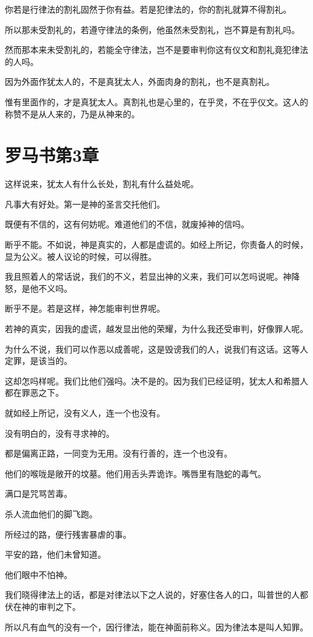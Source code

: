 \documentclass[12pt,oneside]{book}
\begin{document}
你若是行律法的割礼固然于你有益。若是犯律法的，你的割礼就算不得割礼。

所以那未受割礼的，若遵守律法的条例，他虽然未受割礼，岂不算是有割礼吗。

然而那本来未受割礼的，若能全守律法，岂不是要审判你这有仪文和割礼竟犯律法的人吗。

因为外面作犹太人的，不是真犹太人，外面肉身的割礼，也不是真割礼。

惟有里面作的，才是真犹太人。真割礼也是心里的，在乎灵，不在乎仪文。这人的称赞不是从人来的，乃是从神来的。

\chapter{罗马书第3章}
这样说来，犹太人有什么长处，割礼有什么益处呢。

凡事大有好处。第一是神的圣言交托他们。

既便有不信的，这有何妨呢。难道他们的不信，就废掉神的信吗。

断乎不能。不如说，神是真实的，人都是虚谎的。如经上所记，你责备人的时候，显为公义。被人议论的时候，可以得胜。

我且照着人的常话说，我们的不义，若显出神的义来，我们可以怎吗说呢。神降怒，是他不义吗。

断乎不是。若是这样，神怎能审判世界呢。

若神的真实，因我的虚谎，越发显出他的荣耀，为什么我还受审判，好像罪人呢。

为什么不说，我们可以作恶以成善呢，这是毁谤我们的人，说我们有这话。这等人定罪，是该当的。

这却怎吗样呢。我们比他们强吗。决不是的。因为我们已经证明，犹太人和希腊人都在罪恶之下。

就如经上所记，没有义人，连一个也没有。

没有明白的，没有寻求神的。

都是偏离正路，一同变为无用。没有行善的，连一个也没有。

他们的喉咙是敞开的坟墓。他们用舌头弄诡诈。嘴唇里有虺蛇的毒气。

满口是咒骂苦毒。

杀人流血他们的脚飞跑。

所经过的路，便行残害暴虐的事。

平安的路，他们未曾知道。

他们眼中不怕神。

我们晓得律法上的话，都是对律法以下之人说的，好塞住各人的口，叫普世的人都伏在神的审判之下。

所以凡有血气的没有一个，因行律法，能在神面前称义。因为律法本是叫人知罪。
\end{document}
